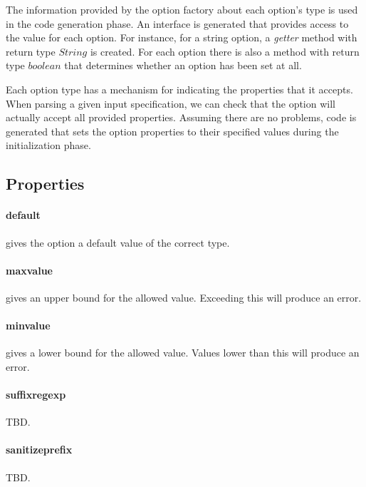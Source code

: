 \documentclass[a4paper]{article}
\begin{document}
The information provided by the option factory about each option's type is used in the code generation
phase. An interface is generated that provides access to the value for each option. For instance, for a
string option, a \emph{getter} method with return type $String$ is created. For each option there is also
a method with return type $boolean$ that determines whether an option has been set at all.

Each option type has a mechanism for indicating the properties that it accepts.
When parsing a given input specification, we can check that the option will
actually accept all provided properties. Assuming there are no problems, code is
generated that sets the option properties to their specified values during the
initialization phase.

\subsection{Properties}


\label{prop:default}
\paragraph{default} gives the option a default value of the correct type.

\label{prop:maxvalue}
\paragraph{maxvalue} gives an upper bound for the allowed value. Exceeding this will produce an error.

\label{prop:minvalue}
\paragraph{minvalue} gives a lower bound for the allowed value. Values lower than this will produce an error.

\label{prop:suffixregexp}
\paragraph{suffixregexp} TBD.

\label{prop:sanitizeprefix}
\paragraph{sanitizeprefix} TBD.

\label{prop:description}
\end{document}
